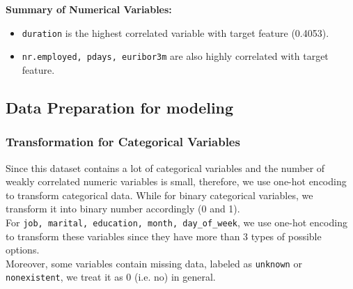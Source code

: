 \documentclass[11pt,a4paper]{article}
\begin{document}
    \textbf{Summary of Numerical Variables:}
    \begin{itemize}
        \item \texttt{duration} is the highest correlated variable with target feature (0.4053).
        \item \texttt{nr.employed, pdays, euribor3m} are also highly correlated with target feature.
    \end{itemize}
    
    
    \subsection{Data Preparation for modeling}
    \subsubsection{Transformation for Categorical Variables}
    Since this dataset contains a lot of categorical variables and the number of weakly correlated numeric variables is small, therefore, we use one-hot encoding to transform categorical data.  While for binary categorical variables, we transform it into binary number accordingly (0 and 1). \\
    For \texttt{job, marital, education, month, day\_of\_week}, we use one-hot encoding to transform these variables since they have more than 3 types of possible options. \\
    Moreover, some variables contain missing data, labeled as \texttt{unknown} or \texttt{nonexistent}, we treat it as 0 (i.e. no) in general.
    
\end{document}
